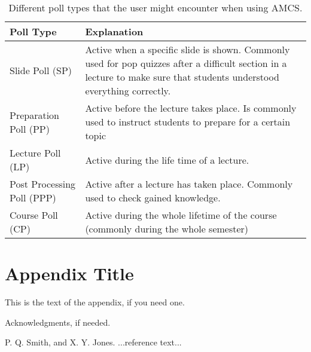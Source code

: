 \documentclass{sigplanconf}
\begin{document}
\begin{table}[t]
	{\renewcommand{\arraystretch}{2}
	\begin{tabular}{ | p{3cm} | p{4.5cm} |}
		\hline
		Poll Type & Explanation \\ \hline \hline
		Slide Poll (SP) & Active when a specific slide is shown. Commonly used for pop quizzes after a difficult section in a lecture to make sure that students understood everything correctly. \\ \hline
		Preparation Poll (PP) & Active before the lecture takes place. Is commonly used to instruct students to prepare for a certain topic \\ \hline
		Lecture Poll (LP) & Active during the life time of a lecture. \\ \hline
		Post Processing Poll (PPP) & Active after a lecture has taken place. Commonly used to check gained knowledge. \\ \hline
	    Course Poll (CP) & Active during the whole lifetime of the course (commonly during the whole semester) \\
		\hline
	\end{tabular}
	}
\caption{Different poll types that the user might encounter when using AMCS.}
\label{tab:pollTypes}
\end{table}


\appendix
\section{Appendix Title}

This is the text of the appendix, if you need one.

\acks

Acknowledgments, if needed.





\begin{thebibliography}{}
\softraggedright

P. Q. Smith, and X. Y. Jones. ...reference text...

\end{thebibliography}
\end{document}
